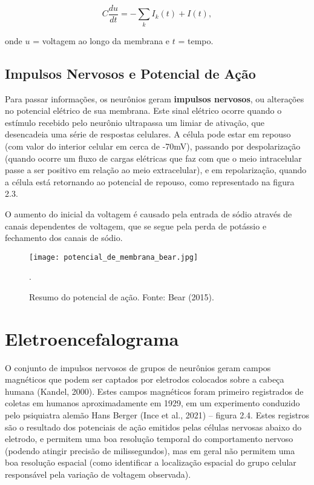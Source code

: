 \begin{equation}
    C \frac{d u }{ d t} =  - \sum_{k} I_k (t) + I (t),
\end{equation}

onde $u$ = voltagem ao longo da membrana e $t$ = tempo. 




\subsection{Impulsos Nervosos e Potencial de Ação}
Para passar informações, os neurônios geram \textbf{impulsos nervosos}, ou alterações no potencial elétrico de sua membrana. Este sinal elétrico
ocorre quando o estímulo recebido pelo neurônio ultrapassa um limiar de ativação, que desencadeia uma série de respostas celulares. A célula pode 
estar em repouso (com valor do interior celular em cerca de -70mV), passando por despolarização (quando ocorre um fluxo de cargas elétricas que faz com 
que o meio intracelular passe a ser positivo em relação ao meio extracelular), e em repolarização, quando a célula está retornando ao potencial de repouso,
como representado na figura 2.3. 

O aumento do inicial da voltagem é causado pela entrada de sódio através de canais dependentes de voltagem, que se segue 
pela perda de potássio e fechamento dos canais de sódio. 


\begin{figure}[!h]
    \centering
    \texttt{[image: potencial\_de\_membrana\_bear.jpg]}
    \caption[Impulsos nervosos conduzidos em neurônios]{Resumo do potencial de ação. Fonte: Bear (2015).}.\label{fig:potencial}
    \end{figure}


\section{Eletroencefalograma}
O conjunto de impulsos nervosos de grupos de neurônios geram campos
magnéticos que podem ser captados por eletrodos colocados sobre a cabeça humana
(Kandel, 2000). Estes campos magnéticos foram primeiro registrados de coletas em
humanos aproximadamente em 1929, em um experimento conduzido pelo psiquiatra
alemão Hans Berger (Ince et al., 2021) – figura
2.4. Estes registros são o resultado dos potenciais de ação emitidos pelas células
nervosas abaixo do eletrodo, e permitem uma boa resolução temporal do
comportamento nervoso (podendo atingir precisão de milissegundos), mas em geral
não permitem uma boa resolução espacial (como identificar a localização espacial do
grupo celular responsável pela variação de voltagem observada).

